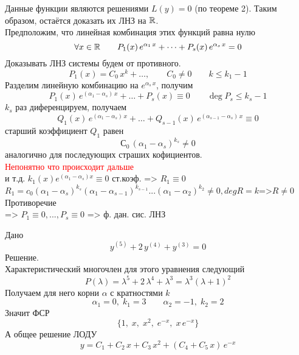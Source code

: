 \begin{Proof}
    Данные функции являются решениями $L(y)=0$ (по теореме 2). Таким образом, остаётся доказать их ЛНЗ на $\mathbb{R}$.\\
    
    Предположим, что линейная комбинация этих функций равна нулю
    \[
        \forall x \in \mathbb{R} \qquad P_1(x)\,e^{\alpha_1\,x} + \dots + P_s(x)\,e^{\alpha_s\,x}=0
    \]
    Доказывать ЛНЗ системы будем от противного.
    \[
        P_1(x)=C_0\,x^k+\dots, \qquad C_0 \neq 0 \qquad k \leqslant k_1-1
    \]
    Разделим линейную комбинацию на $e^{\alpha_s\,x}$, получим 
    \[
        P_1(x)\,e^{(\alpha_1-\alpha_s)\,x}+\dots+P_s(x) \equiv 0 \qquad \deg P_s \leqslant k_s-1
    \]
    $k_s$ раз диференцируем, получаем
    \[
        Q_1(x)\,e^{(\alpha_1-\alpha_s)\,x} + \dots + Q_{s-1}(x)\,e^{(\alpha_{s-1} - \alpha_s)\, x} \equiv 0
    \]
    старший коэффициент $Q_1$ равен
    \[ 
        С_0\,(\alpha_1-\alpha_s)^{k_s} \neq 0
    \]
    аналогично для последующих страших кофициентов.\\
    \textcolor{red}{Непонятно что происходит дальше}\\
    и т.д. $k_1(x)e^{(\alpha_1-\alpha_s) x}\equiv 0$ ст.коэф. => $R_1\equiv 0$\\
    $R_1=c_0(\alpha_1-\alpha_s)^{k_s}(\alpha_1-\alpha_{s-1})^{k_{s-1}}...(\alpha_1-\alpha_2)^{k_2}\neq 0, deg R=k$=>$R\neq 0$\\
    Противоречие\\
    => $P_1\equiv 0,...,P_s\equiv 0$ => ф. дан. сис. ЛНЗ
\end{Proof}

\begin{Example}
    Дано
    \[
        y^{(5)}+2\,y^{(4)}+y^{(3)}=0
    \]
    Решение.\\
    Характеристический многочлен для этого уравнения следующий
    \[
        P(\lambda)=\lambda^5+2\,\lambda^4+\lambda^3=\lambda^3(\lambda+1)^2
    \]
    Получаем для него корни $\alpha$ с кратностями $k$
    \[
        \alpha_1=0,\; k_1=3 \qquad \alpha_2=-1,\; k_2=2
    \]
    Значит ФСР
    \[
        \{1,\; x,\; x^2,\; e^{-x},\; x\,e^{-x}\}
    \]
    А общее решение ЛОДУ
    \[
        y= C_1 + C_2\,x + C_3\,x^2 + (C_4 + C_5\,x)\,e^{-x}
    \]
\end{Example}
